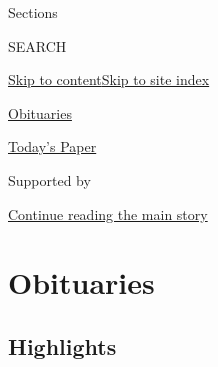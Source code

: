 Sections

SEARCH

\protect\hyperlink{site-content}{Skip to
content}\protect\hyperlink{site-index}{Skip to site index}

\href{https://www.nytimes3xbfgragh.onion/section/obituaries}{Obituaries}

\href{https://myaccount.nytimes3xbfgragh.onion/auth/login?response_type=cookie\&client_id=vi}{}

\href{https://www.nytimes3xbfgragh.onion/section/todayspaper}{Today's
Paper}

Supported by

\protect\hyperlink{after-sponsor}{Continue reading the main story}

\hypertarget{obituaries}{%
\section{Obituaries}\label{obituaries}}

\hypertarget{highlights}{%
\subsection{Highlights}\label{highlights}}

